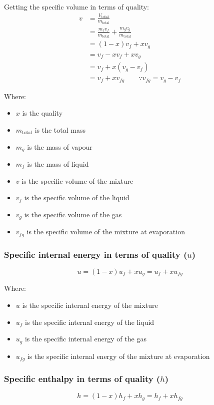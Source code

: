 \documentclass[11pt]{article}
\begin{document}
 \noindent Getting the specific volume in terms of quality:
\begin{align*}
v &= \frac{V_{\text{total}}}{m_{\text{total}}} \\
&= \frac{m_f v_f}{m_{\text{total}}} + \frac{m_g v_g}{m_{\text{total}}} \\
&= (1 - x) v_f + x v_g \\
&= v_f - x v_f + x v_g \\
&= v_f + x (v_g - v_f) \\
&= v_f + xv_{fg} \qquad \because v_{fg} = v_g - v_f
\end{align*}

Where:
\begin{itemize}
\item \(x\) is the quality
\item \(m_{\text{total}}\) is the total mass
\item \(m_g\) is the mass of vapour
\item \(m_f\) is the mass of liquid
\item \(v\) is the specific volume of the mixture
\item \(v_f\) is the specific volume of the liquid
\item \(v_g\) is the specific volume of the gas
\item \(v_{fg}\) is the specific volume of the mixture at evaporation
\end{itemize}

\newpage

\subsubsection{Specific internal energy in terms of quality (\(u\))}
\label{sec:orge053675}
\[u = (1 - x) u_f + xu_g = u_f + x u_{fg}\]

Where:
\begin{itemize}
\item \(u\) is the specific internal energy of the mixture
\item \(u_f\) is the specific internal energy of the liquid
\item \(u_g\) is the specific internal energy of the gas
\item \(u_{fg}\) is the specific internal energy of the mixture at evaporation
\end{itemize}

\subsubsection{Specific enthalpy in terms of quality (\(h\))}
\label{sec:org6c449bf}
\[h = (1 - x) h_f + xh_g = h_f + x h_{fg}\]
\end{document}
